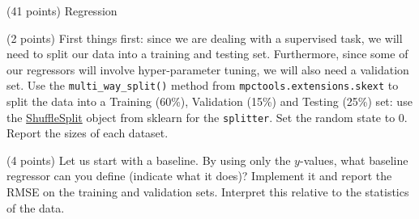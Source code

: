 \documentclass[12pt]{article}
\begin{document}
\begin{question}{\label{Q_LR_BA}(41 points) Regression}





\begin{subquestion}{(2 points) First things first: since we are dealing with a supervised task, we will need to split our data into a training and testing set. Furthermore, since some of our regressors will involve hyper-parameter tuning, we will also need a validation set. Use the \texttt{multi\_way\_split()} method from \texttt{mpctools.extensions.skext} to split the data into a Training (60\%), Validation (15\%) and Testing (25\%) set: use the \href{https://scikit-learn.org/stable/modules/generated/sklearn.model_selection.ShuffleSplit.html}{ShuffleSplit} object from sklearn for the \texttt{splitter}. Set the random state to 0.  Report the sizes of each dataset.}






\end{subquestion}

\begin{subquestion}{(4 points) Let us start with a baseline. By using only the $y$-values, what baseline regressor can you define (indicate what it does)? Implement it and report the RMSE on the training and validation sets. Interpret this relative to the statistics of the data.}



\end{subquestion}
\end{question}
\end{document}

